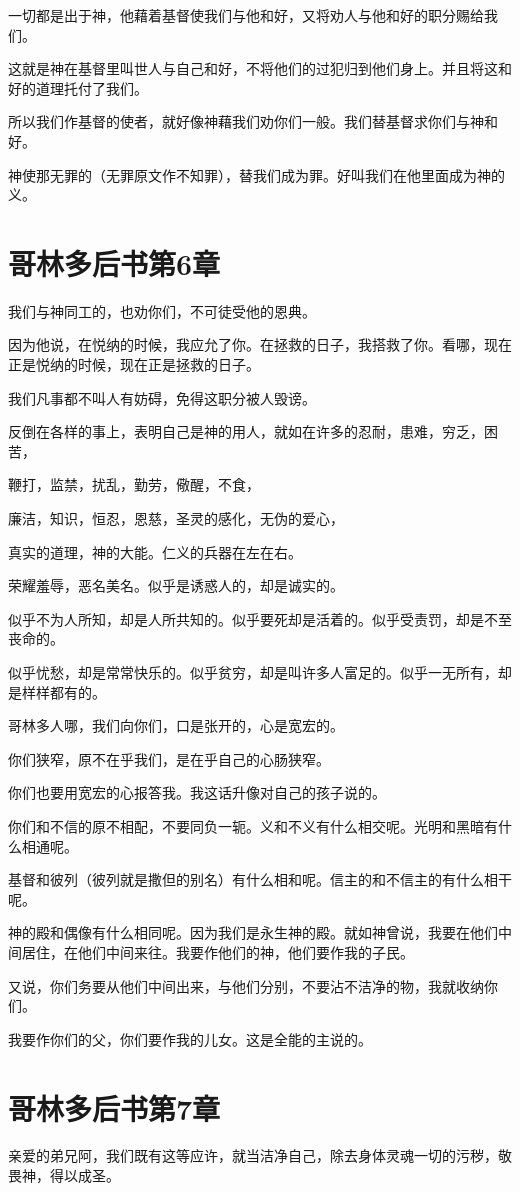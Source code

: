 \documentclass[12pt,oneside]{book}
\begin{document}
一切都是出于神，他藉着基督使我们与他和好，又将劝人与他和好的职分赐给我们。

这就是神在基督里叫世人与自己和好，不将他们的过犯归到他们身上。并且将这和好的道理托付了我们。

所以我们作基督的使者，就好像神藉我们劝你们一般。我们替基督求你们与神和好。

神使那无罪的（无罪原文作不知罪），替我们成为罪。好叫我们在他里面成为神的义。

\chapter{哥林多后书第6章}
我们与神同工的，也劝你们，不可徒受他的恩典。

因为他说，在悦纳的时候，我应允了你。在拯救的日子，我搭救了你。看哪，现在正是悦纳的时候，现在正是拯救的日子。

我们凡事都不叫人有妨碍，免得这职分被人毁谤。

反倒在各样的事上，表明自己是神的用人，就如在许多的忍耐，患难，穷乏，困苦，

鞭打，监禁，扰乱，勤劳，儆醒，不食，

廉洁，知识，恒忍，恩慈，圣灵的感化，无伪的爱心，

真实的道理，神的大能。仁义的兵器在左在右。

荣耀羞辱，恶名美名。似乎是诱惑人的，却是诚实的。

似乎不为人所知，却是人所共知的。似乎要死却是活着的。似乎受责罚，却是不至丧命的。

似乎忧愁，却是常常快乐的。似乎贫穷，却是叫许多人富足的。似乎一无所有，却是样样都有的。

哥林多人哪，我们向你们，口是张开的，心是宽宏的。

你们狭窄，原不在乎我们，是在乎自己的心肠狭窄。

你们也要用宽宏的心报答我。我这话升像对自己的孩子说的。

你们和不信的原不相配，不要同负一轭。义和不义有什么相交呢。光明和黑暗有什么相通呢。

基督和彼列（彼列就是撒但的别名）有什么相和呢。信主的和不信主的有什么相干呢。

神的殿和偶像有什么相同呢。因为我们是永生神的殿。就如神曾说，我要在他们中间居住，在他们中间来往。我要作他们的神，他们要作我的子民。

又说，你们务要从他们中间出来，与他们分别，不要沾不洁净的物，我就收纳你们。

我要作你们的父，你们要作我的儿女。这是全能的主说的。

\chapter{哥林多后书第7章}
亲爱的弟兄阿，我们既有这等应许，就当洁净自己，除去身体灵魂一切的污秽，敬畏神，得以成圣。
\end{document}
